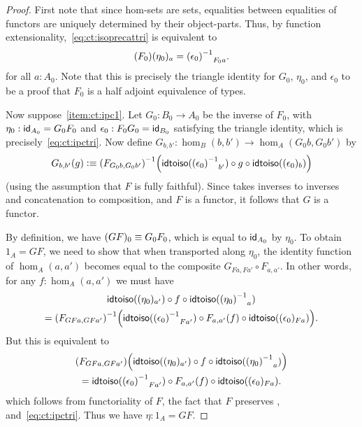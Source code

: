 \documentclass[hott-all.tex]{subfiles}
\begin{document}
\begin{proof}
  First note that since hom-sets are sets, equalities between equalities of functors are uniquely determined by their object-parts.
  Thus, by function extensionality,~\eqref{eq:ct:isoprecattri} is equivalent to
  \begin{equation}
    \map{(F_0)}{\eta_0}_a = \opp{(\epsilon_0)}_{F_0 a}.\fakelabel{eq:ct:ipctri}
  \end{equation}
  for all $a:A_0$.
  Note that this is precisely the triangle identity for $G_0$, $\eta_0$, and $\epsilon_0$ to be a proof that $F_0$ is a half adjoint equivalence of types.

  Now suppose~\ref{item:ct:ipc1}.
  Let $G_0:B_0 \to A_0$ be the inverse of $F_0$, with $\eta_0: \idfunc[A_0] = G_0 F_0$ and $\epsilon_0:F_0G_0 = \idfunc[B_0]$ satisfying the triangle identity, which is precisely~\eqref{eq:ct:ipctri}.
  Now define $G_{b,b'}:\hom_B(b,b') \to \hom_A(G_0b,G_0b')$ by
  \[ G_{b,b'}(g) \defeq
  \inv{(F_{G_0b,G_0b'})}\Big(\idtoiso(\opp{(\epsilon_0)}_{b'}) \circ g \circ \idtoiso((\epsilon_0)_b)\Big)
  \]
  (using the assumption that $F$ is fully faithful).
  Since \idtoiso takes inverses to inverses and concatenation to composition, and $F$ is a functor, it follows that $G$ is a functor.

  By definition, we have $(GF)_0 \jdeq G_0 F_0$, which is equal to $\idfunc[A_0]$ by $\eta_0$.
  To obtain $1_A = GF$, we need to show that when transported along $\eta_0$, the identity function of $\hom_A(a,a')$ becomes equal to the composite $G_{Fa,Fa'} \circ F_{a,a'}$.
  In other words, for any $f:\hom_A(a,a')$ we must have
  \begin{multline*}
    \idtoiso((\eta_0)_{a'}) \circ f \circ \idtoiso(\opp{(\eta_0)}_a)\\
    = \inv{(F_{GFa,GFa'})}\Big(\idtoiso(\opp{(\epsilon_0)}_{Fa'})
    \circ F_{a,a'}(f) \circ \idtoiso((\epsilon_0)_{Fa})\Big).
  \end{multline*}
  But this is equivalent to
  \begin{multline*}
    (F_{GFa,GFa'})\Big(\idtoiso((\eta_0)_{a'}) \circ f \circ \idtoiso(\opp{(\eta_0)}_a)\Big)\\
    = \idtoiso(\opp{(\epsilon_0)}_{Fa'})
    \circ F_{a,a'}(f) \circ \idtoiso((\epsilon_0)_{Fa}).
  \end{multline*}
  which follows from functoriality of $F$, the fact that $F$ preserves \idtoiso, and~\eqref{eq:ct:ipctri}.
  Thus we have $\eta:1_A = GF$.


\end{proof}
\end{document}
